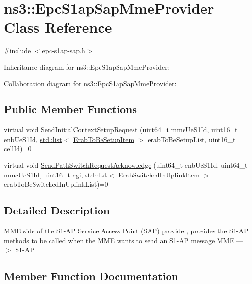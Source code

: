 \hypertarget{classns3_1_1EpcS1apSapMmeProvider}{}\section{ns3\+:\+:Epc\+S1ap\+Sap\+Mme\+Provider Class Reference}
\label{classns3_1_1EpcS1apSapMmeProvider}


{\ttfamily \#include $<$epc-\/s1ap-\/sap.\+h$>$}



Inheritance diagram for ns3\+:\+:Epc\+S1ap\+Sap\+Mme\+Provider\+:


Collaboration diagram for ns3\+:\+:Epc\+S1ap\+Sap\+Mme\+Provider\+:
\subsection*{Public Member Functions}
\begin{DoxyCompactItemize}
\item 
virtual void \hyperlink{classns3_1_1EpcS1apSapMmeProvider_af147967091bda76791089f4db21f9689}{Send\+Initial\+Context\+Setup\+Request} (uint64\+\_\+t mme\+Ue\+S1\+Id, uint16\+\_\+t enb\+Ue\+S1\+Id, \hyperlink{openflow-interface_8h_afd9bcfa176617760671b67580f536fa7}{std\+::list}$<$ \hyperlink{structns3_1_1EpcS1apSap_1_1ErabToBeSetupItem}{Erab\+To\+Be\+Setup\+Item} $>$ erab\+To\+Be\+Setup\+List, uint16\+\_\+t cell\+Id)=0
\item 
virtual void \hyperlink{classns3_1_1EpcS1apSapMmeProvider_a5795491210577b40be1f96d071e0689b}{Send\+Path\+Switch\+Request\+Acknowledge} (uint64\+\_\+t enb\+Ue\+S1\+Id, uint64\+\_\+t mme\+Ue\+S1\+Id, uint16\+\_\+t cgi, \hyperlink{openflow-interface_8h_afd9bcfa176617760671b67580f536fa7}{std\+::list}$<$ \hyperlink{structns3_1_1EpcS1apSap_1_1ErabSwitchedInUplinkItem}{Erab\+Switched\+In\+Uplink\+Item} $>$ erab\+To\+Be\+Switched\+In\+Uplink\+List)=0
\end{DoxyCompactItemize}


\subsection{Detailed Description}
M\+ME side of the S1-\/\+AP Service Access Point (S\+AP) provider, provides the S1-\/\+AP methods to be called when the M\+ME wants to send an S1-\/\+AP message M\+ME ---$>$ S1-\/\+AP 

\subsection{Member Function Documentation}
